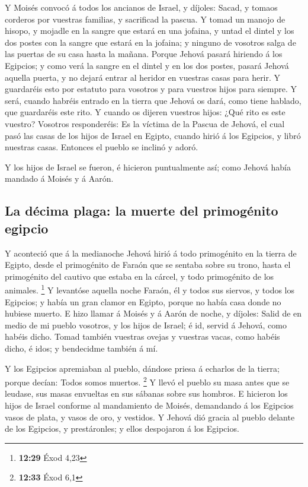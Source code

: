 Y Moisés convocó á todos los ancianos de Israel, y
díjoles: Sacad, y tomaos corderos por vuestras familias, y sacrificad la
pascua.  Y tomad un manojo de hisopo, y mojadle en la
sangre que estará en una jofaina, y untad el dintel y los dos postes con
la sangre que estará en la jofaina; y ninguno de vosotros salga de las
puertas de su casa hasta la mañana.  Porque Jehová pasará
hiriendo á los Egipcios; y como verá la sangre en el dintel y en los dos
postes, pasará Jehová aquella puerta, y no dejará entrar al heridor en
vuestras casas para herir.  Y guardaréis esto por
estatuto para vosotros y para vuestros hijos para siempre.
 Y será, cuando habréis entrado en la tierra que Jehová
os dará, como tiene hablado, que guardaréis este rito.  Y
cuando os dijeren vuestros hijos: ¿Qué rito es este vuestro?
 Vosotros responderéis: Es la víctima de la Pascua de
Jehová, el cual pasó las casas de los hijos de Israel en Egipto, cuando
hirió á los Egipcios, y libró nuestras casas. Entonces el pueblo se
inclinó y adoró.

 Y los hijos de Israel se fueron, é hicieron puntualmente
así; como Jehová había mandado á Moisés y á Aarón.

\hypertarget{la-duxe9cima-plaga-la-muerte-del-primoguxe9nito-egipcio}{%
\subsection{La décima plaga: la muerte del primogénito
egipcio}\label{la-duxe9cima-plaga-la-muerte-del-primoguxe9nito-egipcio}}

 Y aconteció que á la medianoche Jehová hirió á todo
primogénito en la tierra de Egipto, desde el primogénito de Faraón que
se sentaba sobre su trono, hasta el primogénito del cautivo que estaba
en la cárcel, y todo primogénito de los animales. \footnote{\textbf{12:29}
  Éxod 4,23}  Y levantóse aquella noche Faraón, él y
todos sus siervos, y todos los Egipcios; y había un gran clamor en
Egipto, porque no había casa donde no hubiese muerto.  E
hizo llamar á Moisés y á Aarón de noche, y díjoles: Salid de en medio de
mi pueblo vosotros, y los hijos de Israel; é id, servid á Jehová, como
habéis dicho.  Tomad también vuestras ovejas y vuestras
vacas, como habéis dicho, é idos; y bendecidme también á mí.

 Y los Egipcios apremiaban al pueblo, dándose priesa á
echarlos de la tierra; porque decían: Todos somos muertos. \footnote{\textbf{12:33}
  Éxod 6,1}  Y llevó el pueblo su masa antes que se
leudase, sus masas envueltas en sus sábanas sobre sus hombros.
 E hicieron los hijos de Israel conforme al mandamiento
de Moisés, demandando á los Egipcios vasos de plata, y vasos de oro, y
vestidos.  Y Jehová dió gracia al pueblo delante de los
Egipcios, y prestáronles; y ellos despojaron á los Egipcios.

